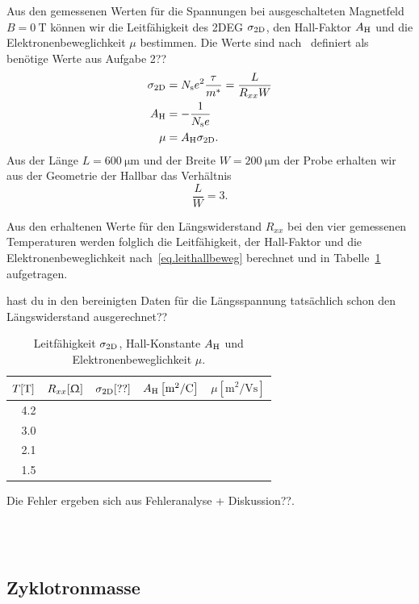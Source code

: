 \documentclass[paper=a4,fontsize=10pt,DIV=18,twocolumn,parskip=half]{scrartcl}
\numberwithin{equation}{section}    %
\renewcommand{\note}[1]{{\color{red}#1??}}
\begin{document}
Aus den gemessenen Werten für die Spannungen bei ausgeschalteten Magnetfeld $B=\SI{0}{\tesla}$ können wir die Leitfähigkeit des 2DEG $\sigma_{\rm 2D}$, den Hall-Faktor $A_{\rm H}$ und die Elektronenbeweglichkeit $\mu$ bestimmen. Die Werte sind nach~\citet{anleitung} definiert als \note{benötige Werte aus Aufgabe 2}
\begin{align}
	\sigma_{\rm 2D} &= N_{\rm s} e^2 \frac{\tau}{m^*} = \frac{L}{R_{xx} W}\\
	A_{\rm H} 		&= -\frac{1}{N_{\rm s}e}\\
	\mu 			&= A_{\rm H} \sigma_{\rm 2D}.
	\label{eq.leithallbeweg}
\end{align}
Aus der Länge $L=\SI{600}{\micro\meter}$ und der Breite $W=\SI{200}{\micro\meter}$ der Probe erhalten wir aus der Geometrie der Hallbar das Verhältnis
\begin{equation}
	\frac{L}{W} = 3.
\end{equation}

Aus den erhaltenen Werte für den Längswiderstand $R_{xx}$ bei den vier gemessenen Temperaturen werden folglich die Leitfähigkeit, der Hall-Faktor und die Elektronenbeweglichkeit nach~\eqref{eq.leithallbeweg} berechnet und in Tabelle~\ref{tab.leithallbeweg} aufgetragen.

\note{hast du in den bereinigten Daten für die Längsspannung tatsächlich schon den Längswiderstand ausgerechnet}

\begin{table}[htp]
	\begin{center}
		\begin{tabular}{rrrrr}
			\hline
			$T[\rm T]$ & $R_{xx}[\Upomega]$ & $\sigma_{\rm 2D}[\rm ??]$ & $A_{\rm H}\left[ \mathrm{m}^2/\mathrm{C} \right]$ & $\mu \left[ \mathrm{m}^2/\mathrm{Vs} \right]$\\
			\hline
			4.2 &&&&\\
			3.0 &&&&\\
			2.1 &&&&\\
			1.5 &&&&\\
			\hline
		\end{tabular}
		\caption{Leitfähigkeit $\sigma_{\rm 2D}$, Hall-Konstante $A_{\rm H}$ und Elektronenbeweglichkeit $\mu$.}
		\label{tab.leithallbeweg}
	\end{center}
\end{table}
Die Fehler ergeben sich aus \note{Fehleranalyse + Diskussion}.

%
~~~~~~~~~~~~~~~~~~~~~~~~~~~~~~~~~~~~~~~~~~~~~~~~~~~~~~~~~~~~~~~~~~~~~~~~~~~~~
\subsection{Zyklotronmasse}
\label{a4}
%
%
~~~~~~~~~~~~~~~~~~~~~~~~~~~~~~~~~~~~~~~~~~~~~~~~~~~~~~~~~~~~~~~~~~~~~~~~~~~~~
\end{document}
